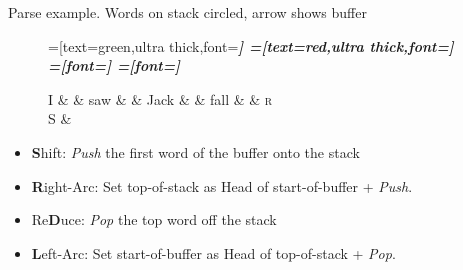 \documentclass{lecture}
\begin{document}
\begin{plain}{Parse example. Words on stack circled, arrow shows buffer}
\begin{figure}
    \centering
    \begin{dependency}[theme=simple]
    =[text=green,ultra thick,font=\bfseries\itshape]
    =[text=red,ultra thick,font=\bfseries\itshape]
    =[font=\bfseries\itshape]
    =[font=\itshape]
    \begin{deptext}[column sep=.075cm, row sep=.1ex]
        I \&           \& saw \&          \& Jack       \& \& fall   \& \& \textsc{r} \\
        S \& \\
    \end{deptext}
\end{dependency}
\end{figure}
    \begin{itemize}
        \item \textbf{S}hift: \emph{Push} the first word of the buffer onto the stack
    \item \textbf{R}ight-Arc: Set top-of-stack as Head of start-of-buffer + \emph{Push}.
    \item Re\textbf{D}uce: \emph{Pop} the top word off the stack
    \item \textbf{L}eft-Arc: Set start-of-buffer as Head of top-of-stack + \emph{Pop}.
    \end{itemize}

\end{plain}
\end{document}
